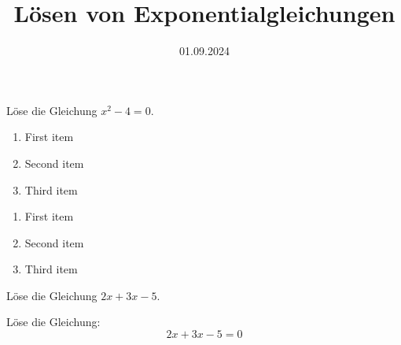 \documentclass[points=left, 
solution,
textsize=14pt,
mathsize=16pt,
boxoffset=0.67cm
]{exam}
\date{01.09.2024}
\title{Lösen von Exponentialgleichungen}
\begin{document}
Löse die Gleichung \(x^2 - 4 = 0\). \\
\begin{enumerate}
    \item First item
    \item Second item
    \item Third item
\end{enumerate}
\begin{enumerate}[label=\alph*)]
    \item First item
    \item Second item
    \item Third item
\end{enumerate}

\lipsum[1]

Löse die Gleichung \(2x + 3x - 5\).

Löse die Gleichung:
\[
    2x + 3x - 5 = 0
\]
\thinkbubble[Test]


\totalpoints
\end{document}
